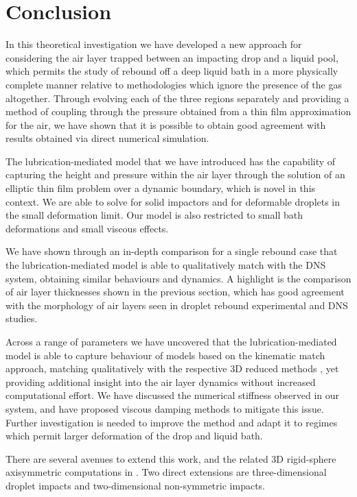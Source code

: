 \section{Conclusion}\label{sect:Conclusion}


In this theoretical investigation we have developed a new approach for considering the air layer trapped between an impacting drop and a liquid pool, which permits the study of rebound off a deep liquid bath in a more physically complete manner relative to methodologies which ignore the presence of the gas altogether. Through evolving each of the three regions separately and providing a method of coupling through the pressure obtained from a thin film approximation for the air, we have shown that it is possible to obtain good agreement with results obtained via direct numerical simulation.

The lubrication-mediated model that we have introduced has the capability of capturing the height and pressure within the air layer through the solution of an elliptic thin film problem over a dynamic boundary, which is novel in this context. We are able to solve for solid impactors and for deformable droplets in the small deformation limit. Our model is also restricted to small bath deformations and small viscous effects.

We have shown through an in-depth comparison for a single rebound case that the lubrication-mediated model is able to qualitatively match with the DNS system, obtaining similar behaviours and dynamics. A highlight is the comparison of air layer thicknesses shown in the previous section, which has good agreement with the morphology of air layers seen in droplet rebound experimental \cite{tang2019bouncing} and DNS studies. 

 Across a range of parameters we have uncovered that the lubrication-mediated model is able to capture behaviour of models based on the kinematic match approach, matching qualitatively with the respective 3D reduced methods \cite{galeano2021capillary, alventosa2023inertio}, yet providing additional insight into the air layer dynamics without increased computational effort. 
 We have discussed the numerical stiffness observed in our system, and have proposed viscous damping methods to mitigate this issue. Further investigation is needed to improve the method and adapt it to regimes which permit larger deformation of the drop and liquid bath. 

 There are several avenues to extend this work, and the related 3D rigid-sphere axisymmetric computations in \cite{phillips2024lubrication}. Two direct extensions are three-dimensional droplet impacts and two-dimensional non-symmetric impacts.

